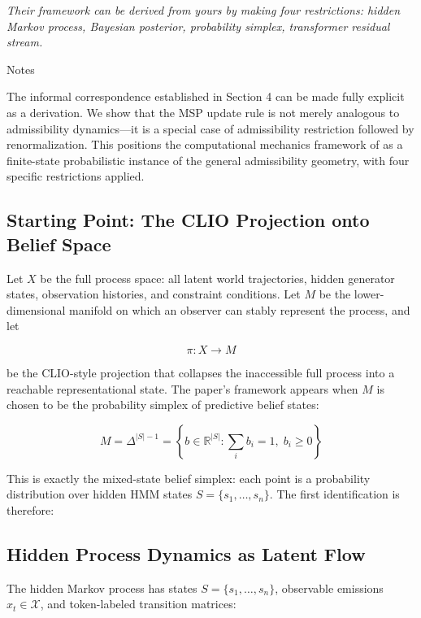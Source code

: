 \documentclass[12pt, a4paper]{article}
\theoremstyle{plain}
\theoremstyle{definition}
\theoremstyle{remark}
\begin{document}
\epigraph{\textit{Their framework can be derived from yours by making four
restrictions: hidden Markov process, Bayesian posterior, probability simplex,
transformer residual stream.}}{Notes}

\noindent
The informal correspondence established in Section 4 can be made fully
explicit as a derivation. We show that the MSP update rule is not merely
analogous to admissibility dynamics---it is a special case of admissibility
restriction followed by renormalization. This positions the computational
mechanics framework of \citet{shai2025} as a finite-state probabilistic
instance of the general admissibility geometry, with four specific
restrictions applied.

\subsection{Starting Point: The CLIO Projection onto Belief Space}

Let $X$ be the full process space: all latent world trajectories, hidden
generator states, observation histories, and constraint conditions. Let
$M$ be the lower-dimensional manifold on which an observer can stably
represent the process, and let

$$\pi: X \to M$$

be the CLIO-style projection that collapses the inaccessible full process
into a reachable representational state. The paper's framework appears when
$M$ is chosen to be the probability simplex of predictive belief states:

$$M = \Delta^{|S|-1} = \left\{b \in \mathbb{R}^{|S|} : \sum_i b_i = 1,\;
b_i \geq 0\right\}$$

This is exactly the mixed-state belief simplex: each point is a probability
distribution over hidden HMM states $S = \{s_1, \ldots, s_n\}$. The first
identification is therefore:

\begin{center}
\end{center}

\subsection{Hidden Process Dynamics as Latent Flow}

The hidden Markov process has states $S = \{s_1, \ldots, s_n\}$, observable
emissions $x_t \in \mathcal{X}$, and token-labeled transition matrices:
\end{document}
